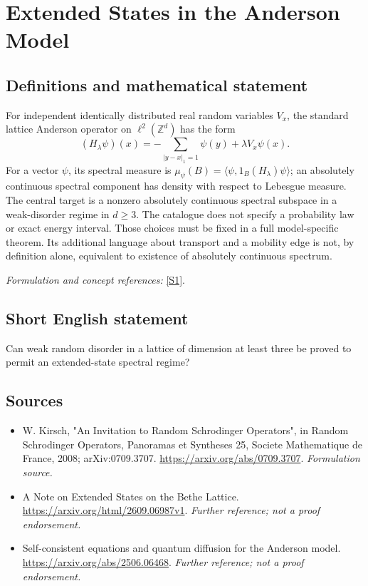 \documentclass[11pt]{article}
\begin{document}
\section*{\texorpdfstring{Extended States in the Anderson Model}{Extended States in the Anderson Model}}\label{7900001}
\subsection{Definitions and mathematical statement}
For independent identically distributed real random variables $V_x$, the standard lattice Anderson operator on $\ell^2({\mathbb{Z}}^d)$ has the form
\[
 (H_\lambda\psi)(x)=-\sum_{|y-x|_1=1}\psi(y)+\lambda V_x\psi(x).
\]
For a vector $\psi$, its spectral measure is $\mu_\psi(B)=\langle\psi,1_B(H_\lambda)\psi\rangle$; an absolutely continuous spectral component has density with respect to Lebesgue measure. The central target is a nonzero absolutely continuous spectral subspace in a weak-disorder regime in $d\ge3$. The catalogue does not specify a probability law or exact energy interval. Those choices must be fixed in a full model-specific theorem. Its additional language about transport and a mobility edge is not, by definition alone, equivalent to existence of absolutely continuous spectrum.
\par\smallskip\textit{Formulation and concept references:} \href{https://arxiv.org/abs/0709.3707}{[S1]}.

\subsection{Short English statement}
Can weak random disorder in a lattice of dimension at least three be proved to permit an extended-state spectral regime?
\subsection{Sources}
\begin{itemize}
\item[S1]W. Kirsch, "An Invitation to Random Schrodinger Operators", in Random Schrodinger Operators, Panoramas et Syntheses 25, Societe Mathematique de France, 2008; arXiv:0709.3707.
\url{https://arxiv.org/abs/0709.3707}.
\textit{Formulation source.}
\item[S2]A Note on Extended States on the Bethe Lattice.
\url{https://arxiv.org/html/2609.06987v1}.
\textit{Further reference; not a proof endorsement.}
\item[S3]Self-consistent equations and quantum diffusion for the Anderson model.
\url{https://arxiv.org/abs/2506.06468}.
\textit{Further reference; not a proof endorsement.}
\end{itemize}
\end{document}
